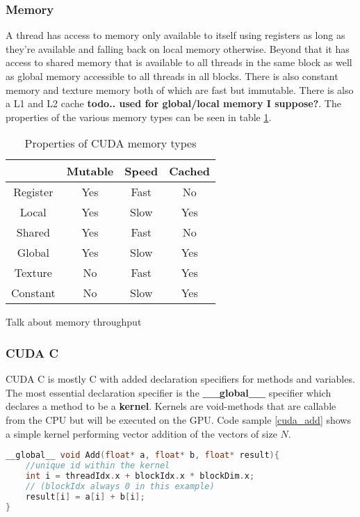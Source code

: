 \subsubsection{Memory}
A thread has access to memory only available to itself using registers as long as they're available and falling back on local memory otherwise.
Beyond that it has access to shared memory that is available to all threads in the same block as well as global memory accessible to all threads in all blocks.
There is also constant memory and texture memory both of which are fast but immutable. 
There is also a L1 and L2 cache \textbf{todo.. used for global/local memory I suppose?}.
The properties of the various memory types can be seen in table \ref{table:memorytypes}.
{\renewcommand{\arraystretch}{3}%
\begin{table}[h!]
\centering
\begin{tabular}{ | c | c | c | c | }
  \hline
           & Mutable & Speed & Cached \\ \hline
  Register & Yes     & Fast  & No     \\ \hline
  Local    & Yes     & Slow  & Yes    \\ \hline
  Shared   & Yes     & Fast  & No     \\ \hline
  Global   & Yes     & Slow  & Yes    \\ \hline
  Texture  & No      & Fast  & Yes    \\ \hline
  Constant & No      & Slow  & Yes    \\ \hline

\end{tabular}
\caption{Properties of CUDA memory types\label{table:memorytypes}}
\end{table}

Talk about memory throughput

\subsubsection{CUDA C}
CUDA C is mostly C with added declaration specifiers for methods and variables. The most essential declaration specifier is the \textbf{\_\_global\_\_} specifier which declares a method to be a \textbf{kernel}. Kernels are void-methods that are callable from the CPU but will be executed on the GPU. Code sample \ref{cuda_add} shows a simple kernel performing vector addition of the vectors of size $N$.

\begin{lstlisting}[language=C++, caption=CUDA C addition kernel, label=cuda_add]
__global__ void Add(float* a, float* b, float* result){
	//unique id within the kernel
	int i = threadIdx.x + blockIdx.x * blockDim.x;
	// (blockIdx always 0 in this example)
	result[i] = a[i] + b[i];
}


\end{lstlisting}}
